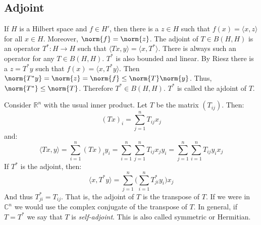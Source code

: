         \subsection{Adjoint}
            If $H$ is a Hilbert space and
            $f\in{H'}$, then there is a $z\in{H}$
            such that $f(x)=\langle{x,z}\rangle$ for
            all $x\in{H}$. Moreover, $\norm{f}=\norm{z}$.
            The adjoint of $T\in{B(H,H)}$ is an
            operator $T^{*}:H\rightarrow{H}$ such that
            $\langle{Tx,y}\rangle=\langle{x,T^{*}}\rangle$.
            There is always such an operator for any
            $T\in{B(H,H)}$. $T^{*}$ is also bounded and
            linear. By Riesz there is a $z=T^{*}y$ such
            that $f(x)=\langle{x,T^{*}y}\rangle$. Then
            $\norm{T^{*}y}=\norm{z}=\norm{f}\leq\norm{T}\norm{y}$.
            Thus, $\norm{T^{*}}\leq\norm{T}$. Therefore
            $T^{*}\in{B(H,H)}$. $T^{*}$ is called the
            ajdoint of $T$.
            \begin{example}
                Consider $\mathbb{R}^{n}$ with the usual
                inner product. Let $T$ be the matrix
                $(T_{ij})$. Then:
                \begin{equation*}
                    (Tx)_{i}=\sum_{j=1}^{n}T_{ij}x_{j}
                \end{equation*}
                and:
                \begin{equation*}
                    \langle{Tx,y}\rangle
                    =\sum_{i=1}^{n}(Tx)_{i}y_{i}
                    =\sum_{i=1}^{n}\sum_{j=1}^{n}
                    T_{ij}x_{j}y_{i}
                    =\sum_{j=1}^{n}\sum_{i=1}^{n}
                    T_{ij}y_{i}x_{j}
                \end{equation*}
                If $T^{*}$ is the adjoint, then:
                \begin{equation*}
                    \langle{x,T^{*}y}\rangle
                    =\sum_{j=1}^{n}
                    \Big(\sum_{i=1}^{n}
                         T^{*}_{ji}y_{i}\Big)x_{j}
                \end{equation*}
                And thus $T^{*}_{ji}=T_{ij}$.
                That is, the adjoint
                of $T$ is the transpose of $T$. If we were in
                $\mathbb{C}^{n}$ we would use the complex
                conjugate of the transpose of $T$.
                In general, if $T=T^{*}$
                we say that $T$ is \textit{self-adjoint}.
                This is also called symmetric or Hermitian.
            \end{example}
